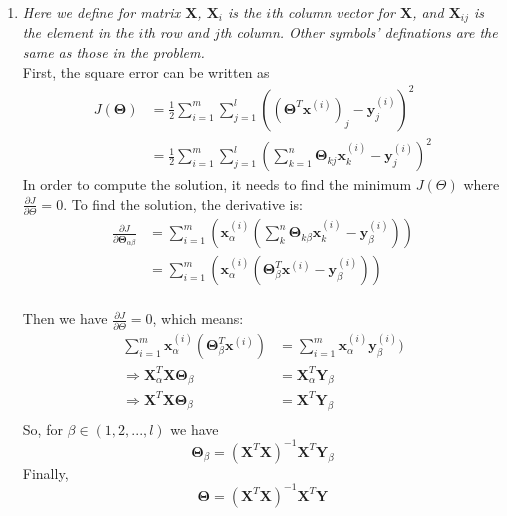 \documentclass[a4paper]{article}
\begin{document}
\begin{enumerate}
\item \small{\textsl{Here we define for matrix $\boldsymbol{X}$, $\boldsymbol{X}_i$ is the $i$th column vector for $\boldsymbol{X}$, and $\boldsymbol{X}_{ij}$ is the element in the $i$th row and $j$th column. Other symbols' definations are the same as those in the problem.}}\\
First, the square error can be written as 
  \begin{equation*}
    \begin{aligned}
      J(\boldsymbol \Theta) 
      &= \frac{1}{2} \sum_{i = 1}^m \sum_{j = 1}^l (({\boldsymbol \Theta}^T \boldsymbol{x}^{(i)})_j - \boldsymbol{y}_j^{(i)})^2\\
      &= \frac{1}{2} \sum_{i = 1}^m \sum_{j = 1}^l (\sum_{k=1}^n \boldsymbol{\Theta}_{kj} \boldsymbol{x}^{(i)}_k - \boldsymbol{y}_j^{(i)})^2
    \end{aligned}
  \end{equation*}
  In order to compute the solution, it needs to find the minimum $J(\Theta)$ where $\frac{\partial J}{\partial \Theta}=0$. To find the solution, the derivative is:
  \begin{equation*}
    \begin{aligned}
      \frac{\partial J}{\partial \boldsymbol{\Theta}_{\alpha \beta}}
      &= \sum_{i = 1}^m (\boldsymbol{x}_\alpha^{(i)}(\sum_k^n \boldsymbol{\Theta}_{k \beta} \boldsymbol{x}_k^{(i)}-\boldsymbol{y}_{\beta}^{(i)}))\\
      &= \sum_{i = 1}^m (\boldsymbol{x}_\alpha^{(i)}(\boldsymbol{\Theta}_\beta^T \boldsymbol{x}^{(i)}-\boldsymbol{y}_{\beta}^{(i)}))\\
    \end{aligned}
  \end{equation*}
  
  Then we have $\frac{\partial J}{\partial \Theta}=0$, which means:
  \begin{equation*}
    \begin{aligned}
      \sum_{i = 1}^m \boldsymbol{x}_\alpha^{(i)}(\boldsymbol{\Theta}_\beta^T \boldsymbol{x}^{(i)})
      &= \sum_{i = 1}^m \boldsymbol{x}^{(i)}_\alpha \boldsymbol{y}_{\beta}^{(i)})\\
      \Rightarrow \boldsymbol{X}_\alpha^T \boldsymbol{X} \boldsymbol{\Theta}_\beta &= \boldsymbol{X}_\alpha^T \boldsymbol{Y}_{\beta}\\
      \Rightarrow \boldsymbol{X}^T \boldsymbol{X} \boldsymbol{\Theta}_\beta &= \boldsymbol{X}^T \boldsymbol{Y}_{\beta}\\
    \end{aligned}
  \end{equation*}
  So, for $\beta \in (1,2,...,l)$ we have
  \begin{equation*}
    \boldsymbol{\Theta}_\beta = (\boldsymbol{X}^T \boldsymbol{X})^{-1} \boldsymbol{X}^T \boldsymbol{Y}_{\beta}
  \end{equation*}
  Finally,
  \begin{equation*}
    \boldsymbol{\Theta} = (\boldsymbol{X}^T \boldsymbol{X})^{-1} \boldsymbol{X}^T \boldsymbol{Y}
  \end{equation*}



\end{enumerate}
\end{document}
